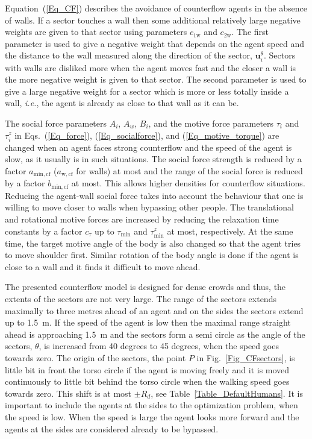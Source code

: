 \documentclass[12pt,a4paper,final,twoside]{stylevk}
\begin{document}
Equation~(\ref{Eq_CF}) describes the avoidance of counterflow agents
in the absence of walls.  If a sector touches a wall then some
additional relatively large negative weights are given to that sector
using parameters $c_\mathrm{1w}$ and $c_\mathrm{2w}$.  The first
parameter is used to give a negative weight that depends on the agent
speed and the distance to the wall measured along the direction of the
sector, $\mathbf{u}^\theta_i$.  Sectors with walls are disliked more
when the agent moves fast and the closer a wall is the more negative
weight is given to that sector.  The second parameter is used to give
a large negative weight for a sector which is more or less totally
inside a wall, \emph{i.e.}, the agent is already as close to that wall
as it can be.


The social force parameters $A_i$, $A_w$, $B_i$, and the motive force
parameters $\tau_i$ and $\tau^z_i$ in Eqs.~(\ref{Eq_force}),
(\ref{Eq_socialforce}), and (\ref{Eq_motive_torque}) are changed when
an agent faces strong counterflow and the speed of the agent is slow,
as it usually is in such situations.  The social force strength is
reduced by a factor $a_\mathrm{min,cf}$ ($a_\mathrm{w,cf}$ for walls)
at most and the range of the social force is reduced by a factor
$b_\mathrm{min,cf}$ at most.  This allows higher densities for
counterflow situations.  Reducing the agent-wall social force takes
into account the behaviour that one is willing to move closer to walls
when bypassing other people.  The translational and rotational motive
forces are increased by reducing the relaxation time constants by a
factor $c_\tau$ up to $\tau_\mathrm{min}$ and $\tau_\mathrm{min}^z$ at
most, respectively.  At the same time, the target motive angle of the
body is also changed so that the agent tries to move shoulder first.
Similar rotation of the body angle is done if the agent is close to a
wall and it finds it difficult to move ahead.


The presented counterflow model is designed for dense crowds and thus,
the extents of the sectors are not very large.  The range of the
sectors extends maximally to three metres ahead of an agent and on the
sides the sectors extend up to 1.5~m.  If the speed of the agent is
low then the maximal range straight ahead is approaching 1.5~m and the
sectors form a semi circle as the angle of the sectors, $\theta$, is
increased from 40 degrees to 45 degrees, when the speed goes towards
zero.  The origin of the sectors, the point $P$ in
Fig.~\ref{Fig_CFsectors}, is little bit in front the torso circle if
the agent is moving freely and it is moved continuously to little bit
behind the torso circle when the walking speed goes towards zero.
This shift is at most $\pm R_d$, see Table~\ref{Table_DefaultHumans}.
It is important to include the agents at the sides to the optimization
problem, when the speed is low.  When the speed is large the agent
looks more forward and the agents at the sides are considered already
to be bypassed.
\end{document}
